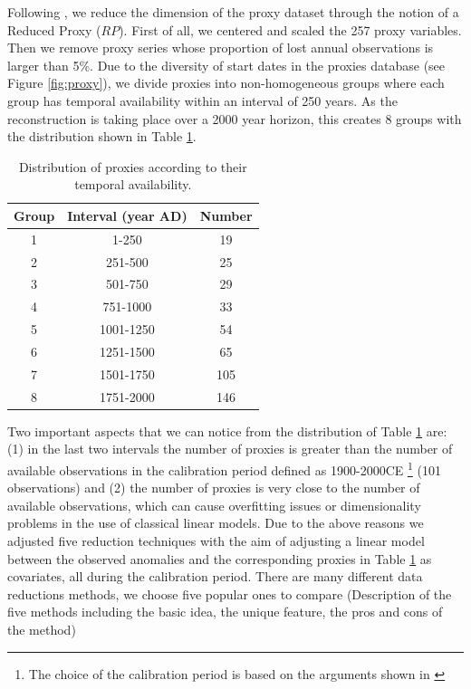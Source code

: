 \documentclass[11pt]{amsart}
\theoremstyle{plain}
\theoremstyle{definition}
\theoremstyle{remark}
\begin{document}
Following \cite{Barboza2014}, we reduce the dimension of the proxy dataset
through the notion of a Reduced Proxy ($RP$). First of all, we centered and
scaled the 257 proxy variables. Then we remove proxy series whose proportion of lost
annual 
observations is larger than 5\%. Due to the diversity of start
dates in the proxies database (see Figure \ref{fig:proxy}), we divide
proxies into non-homogeneous groups where each group has temporal availability within an
interval of 250 years. As the reconstruction is taking place over a 2000 year
horizon, this creates 8 groups with the distribution shown in Table \ref{tab:distdate}.
\begin{table}
  \centering
  \begin{tabular}{c|c|c}
    \toprule
    Group & Interval (year AD) & Number \\
    \midrule
    1 & 1-250 & 19 \\
    2 & 251-500 & 25 \\
    3 & 501-750 & 29 \\
    4 & 751-1000 & 33 \\
    5 & 1001-1250 & 54 \\
    6 & 1251-1500 & 65 \\
    7 & 1501-1750 & 105 \\
    8 & 1751-2000 & 146 \\
    \bottomrule
  \end{tabular}
  \caption{Distribution of proxies according to their temporal availability.}
  \label{tab:distdate}
\end{table}
Two important aspects that we can notice from the distribution of Table
\ref{tab:distdate} are: (1) in the last two intervals the number of proxies is greater than
the number of available observations in the calibration period defined as
1900-2000CE \footnote{The choice of the calibration period is based on the
  arguments shown in \cite{Barboza2014}} (101 observations) and (2) the number of proxies is very close to the
number of available observations, which can cause overfitting issues or
dimensionality problems in the use of classical linear models. Due to the above
reasons we adjusted five reduction techniques with the aim of adjusting
a linear model between the observed anomalies and the corresponding proxies in
Table \ref{tab:distdate} as covariates, all during the calibration
period. There are many different data reductions methods, we choose five popular ones to compare (Description of the five methods including the basic idea, the unique feature, the pros and cons of the method)
\end{document}
